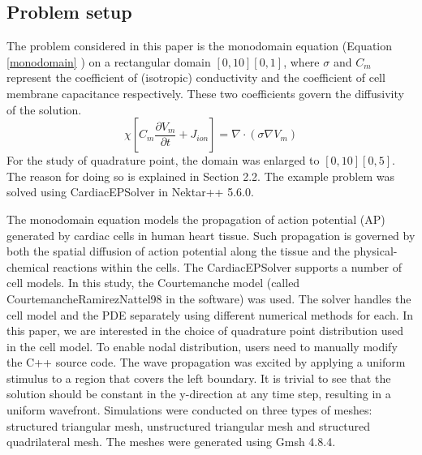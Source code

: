 \subsection{Problem setup}
The problem considered in this paper is the monodomain equation (Equation \ref{monodomain} \cite{RefWorks:clayton2011models}) on a rectangular domain $[0,10][0,1]$, where $\sigma$ and $C_m$ represent the coefficient of (isotropic) conductivity and the coefficient of cell membrane capacitance respectively. These two coefficients govern the diffusivity of the solution. 
\begin{equation}
    \chi [C_m \frac{\partial V_m}{\partial t} + J_{ion}] = \nabla \cdot (\sigma \nabla V_m)
    \label{monodomain}
\end{equation}
For the study of quadrature point, the domain was enlarged to $[0,10][0,5]$. The reason for doing so is explained in Section 2.2. The example problem was solved using CardiacEPSolver in Nektar++ 5.6.0. 
\par
The monodomain equation models the propagation of action potential (AP) generated by cardiac cells in human heart tissue. Such propagation is governed by both the spatial diffusion of action potential along the tissue and the physical-chemical reactions within the cells. The CardiacEPSolver supports a number of cell models. In this study, the Courtemanche model \cite{RefWorks:courtemanche1998ionic} (called CourtemancheRamirezNattel98 in the software) was used.  The solver handles the cell model and the PDE separately using different numerical methods for each. In this paper, we are interested in the choice of quadrature point distribution used in the cell model. To enable nodal distribution, users need to manually modify the C++ source code. The wave propagation was excited by applying a uniform stimulus to a region that covers the left boundary. It is trivial to see that the solution should be constant in the y-direction at any time step, resulting in a uniform wavefront. Simulations were conducted on three types of meshes: structured triangular mesh, unstructured triangular mesh and structured quadrilateral mesh. The meshes were generated using Gmsh 4.8.4.
